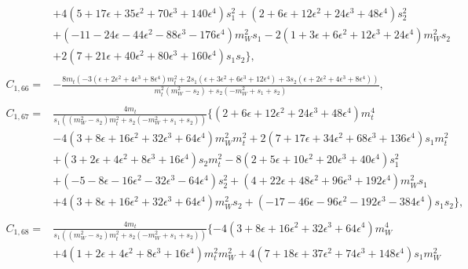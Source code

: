 \documentclass[twocolumn,aps,showpacs,nofootinbib,superscriptaddress,prd]{revtex4-2}
\begin{document}
\begin{widetext}
\begin{align}
\nonumber\\&
+4\left(5 +17 \epsilon +35 \epsilon^2 +70 \epsilon^3 +140 \epsilon^4\right)s_1^2+\left(2 +6 \epsilon +12 \epsilon^2 +24 \epsilon^3 +48 \epsilon^4\right)s_2^2
\nonumber\\&
+\left(-11 -24 \epsilon -44 \epsilon^2 -88 \epsilon^3 -176 \epsilon^4\right)m_W^2s_1-2\left(1 +3 \epsilon +6 \epsilon^2 +12 \epsilon^3 +24 \epsilon^4\right)m_W^2s_2
\nonumber\\&
+2\left(7 +21\epsilon +40 \epsilon^2 +80 \epsilon^3 +160 \epsilon^4\right)s_1s_2\}
,\nonumber\\
\nonumber\\
C_{1,66}=&-\frac{8m_t\left(-3\left(\epsilon +2 \epsilon^2 +4 \epsilon^3 +8 \epsilon^4\right)m_t^2+2s_1\left(\epsilon +3 \epsilon^2 +6 \epsilon^3 +12 \epsilon^4\right)+3s_2\left(\epsilon +2 \epsilon^2 +4 \epsilon^3 +8 \epsilon^4\right)\right)}{m_t^2\left(m_W^2-s_2\right)+s_2
\left(-m_W^2+s_1+s_2\right)}
,\nonumber\\
\nonumber\\
C_{1,67}=&\frac{4m_t}{s_1\left(\left(m_W^2-s_2\right)m_t^2+s_2\left(-m_W^2+s_1+s_2\right)\right)}\{\left(2 +6 \epsilon +12 \epsilon^2 +24 \epsilon^3 +48 \epsilon^4\right)m_t^4
\nonumber\\&
-4\left(3 +8 \epsilon +16 \epsilon^2 +32 \epsilon^3 +64 \epsilon^4\right)m_W^2m_t^2+2\left(7 +17 \epsilon +34 \epsilon^2 +68 \epsilon^3 +136 \epsilon^4\right)s_1m_t^2
\nonumber\\&
+\left(3 +2 \epsilon +4 \epsilon^2 +8 \epsilon^3 +16 \epsilon^4\right)s_2m_t^2-8\left(2 +5 \epsilon +10 \epsilon^2 +20 \epsilon^3 +40 \epsilon^4\right)s_1^2
\nonumber\\&
+\left(-5 -8 \epsilon -16 \epsilon^2 -32 \epsilon^3 -64 \epsilon^4\right)s_2^2+\left(4 +22 \epsilon +48 \epsilon^2 +96 \epsilon^3 +192 \epsilon^4\right)m_W^2s_1
\nonumber\\&
+4\left(3 +8 \epsilon +16 \epsilon^2 +32 \epsilon^3 +64 \epsilon^4\right)m_W^2s_2+\left(-17 -46 \epsilon -96 \epsilon^2 -192 \epsilon^3 -384 \epsilon^4\right)s_1s_2\}
,\nonumber\\
\nonumber\\
C_{1,68}=&\frac{4m_t}{s_1\left(\left(m_W^2-s_2\right)m_t^2+s_2\left(-m_W^2+s_1+s_2\right)\right)}\{-4\left(3 +8 \epsilon +16 \epsilon^2 +32 \epsilon^3 +64 \epsilon^4\right)m_W^4
\nonumber\\&
+4\left(1 +2 \epsilon +4 \epsilon^2 +8 \epsilon^3 +16 \epsilon^4\right)m_t^2m_W^2+4\left(7 +18 \epsilon +37 \epsilon^2 +74 \epsilon^3 +148 \epsilon^4\right)s_1m_W^2

\end{align}
\end{widetext}
\end{document}
